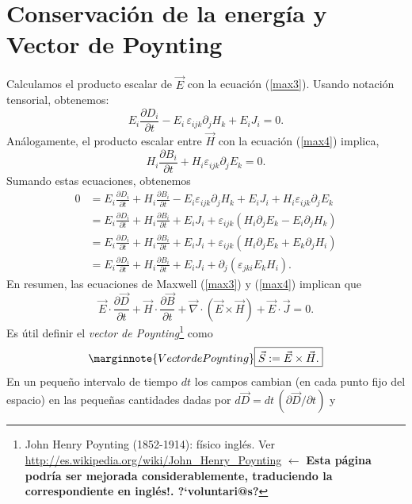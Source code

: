 \section{Conservación de la energía y Vector de Poynting}\label{sec:energia}
Calculamos el producto escalar de $\vec{E}$ con la ecuación (\ref{max3}).
Usando notación tensorial, obtenemos:
\begin{equation}
 E_i\frac{\partial D_i}{\partial t}
-E_i\,\varepsilon_{ijk}\partial_jH_k+E_iJ_i=0.
\end{equation}
Análogamente, el producto escalar entre $\vec{H}$ con la ecuación
(\ref{max4}) implica,
\begin{equation}
H_i\frac{\partial B_i}{\partial t} +H_i\varepsilon_{ijk}\partial_jE_k=0.
\end{equation}
Sumando estas ecuaciones, obtenemos
\begin{align}
0 &= E_i\frac{\partial D_i}{\partial t}+H_i\frac{\partial B_i}{\partial t}
-E_i\varepsilon_{ijk}\partial_jH_k+E_iJ_i+H_i\varepsilon
_{ijk}\partial_jE_k\\
 &= E_i\frac{\partial D_i}{\partial t}+H_i\frac{\partial B_i}{\partial
t}+E_iJ_i+\varepsilon_{ijk}\left(H_i\partial_jE_k-E_i\partial_jH_k\right)\\
 &= E_i\frac{\partial D_i}{\partial t}+H_i\frac{\partial B_i}{\partial
t}+E_iJ_i+\varepsilon_{ijk}\left(H_i\partial_jE_k+E_k\partial_jH_i\right)\\
 &= E_i\frac{\partial D_i}{\partial t}+H_i\frac{\partial B_i}{\partial
t}+E_iJ_i+\partial_j(\varepsilon_{jki}E_kH_i).
\end{align}
En resumen, las ecuaciones de Maxwell (\ref{max3}) y (\ref{max4}) implican que
\begin{equation}
\boxed{\vec{E}\cdot\frac{\partial \vec{D}}{\partial
t}+\vec{H}\cdot\frac{\partial\vec{B}}{\partial t}+
\vec\nabla\cdot(\vec{E}\times\vec{H})
+\vec{E}\cdot\vec{J}=0.} \label{cEem0}
\end{equation}
Es útil definir el \textit{vector de Poynting}\footnote{John Henry Poynting (1852-1914): físico inglés. Ver \url{http://es.wikipedia.org/wiki/John_Henry_Poynting} $\leftarrow$ \textbf{Esta página podría ser mejorada considerablemente, traduciendo la correspondiente en inglés!. ?`voluntari@s?}} como
\begin{equation}\label{defPoy}\marginnote{Vector de Poynting}
\boxed{\vec{S}:=\vec{E}\times\vec{H}.}
\end{equation}
En un pequeño intervalo de tiempo $dt$ los campos cambian (en cada punto fijo del espacio) en las pequeñas cantidades dadas por $d\vec{D}=dt\,({\partial \vec{D}}/{\partial t})$ y
